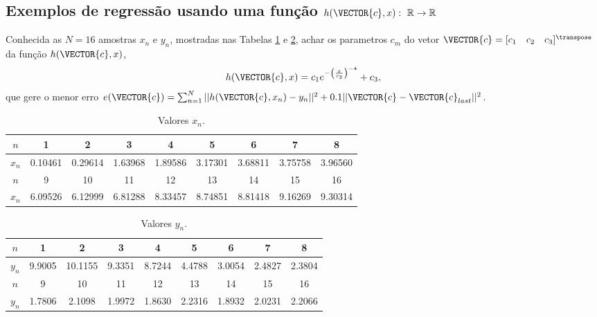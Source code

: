 \subsection{Exemplos de regressão usando uma função
$h(\VECTOR{c},x):~\mathbb{R} \rightarrow \mathbb{R}$}

\begin{example}\label{ex:theo:maphcxr1r1}
Conhecida as $N=16$ amostras $x_n$ e $y_n$, mostradas nas  
Tabelas \ref{table:theo:maphcxr1r1:xn} e \ref{table:theo:maphcxr1r1:yn},
achar os parametros $c_m$ do vetor $\VECTOR{c}=[c_1\quad c_2\quad c_3]^{\transpose}$ da função $h(\VECTOR{c},x)$, 
\begin{equation}
h(\VECTOR{c},x)=c_1 e^{-\left(\frac{x}{c_2}\right)^{-4}}+c_3,
\end{equation}
que gere o menor erro 
$e(\VECTOR{c})= \sum_{n=1}^{N} ||h(\VECTOR{c},x_n)-y_n||^2 + 0.1 ||\VECTOR{c}-\VECTOR{c}_{last}||^2 $.
\end{example}


\begin{table}[h!]
\centering
\begin{tabular}{|c|c|c|c|c|c|c|c|c|} 
 \hline
$n$   & 1 & 2 & 3 & 4 & 5 & 6 & 7 & 8\\ \hline
$x_n$ & 0.10461 & 0.29614 & 1.63968 & 1.89586 & 3.17301 & 3.68811 & 3.75758 & 3.96560 \\ \hline
 \hline
$n$   & 9 & 10 & 11 & 12 & 13 & 14 & 15 & 16\\  \hline
$x_n$ & 6.09526 & 6.12999 & 6.81288 & 8.33457 & 8.74851 & 8.81418 & 9.16269 & 9.30314 \\ \hline
\end{tabular}
\caption{Valores $x_n$.}
\label{table:theo:maphcxr1r1:xn}
\end{table}

\begin{table}[h!]
\centering
\begin{tabular}{|c|c|c|c|c|c|c|c|c|} 
 \hline
$n$   & 1 & 2 & 3 & 4 & 5 & 6 & 7 & 8\\ \hline
$y_n$ & 9.9005 & 10.1155 & 9.3351 & 8.7244 & 4.4788 & 3.0054 & 2.4827 & 2.3804  \\ \hline
 \hline
$n$   & 9 & 10 & 11 & 12 & 13 & 14 & 15 & 16\\  \hline
$y_n$ & 1.7806 & 2.1098 & 1.9972 & 1.8630 & 2.2316 & 1.8932 & 2.0231 & 2.2066 \\ \hline
\end{tabular}
\caption{Valores $y_n$.}
\label{table:theo:maphcxr1r1:yn}
\end{table}

